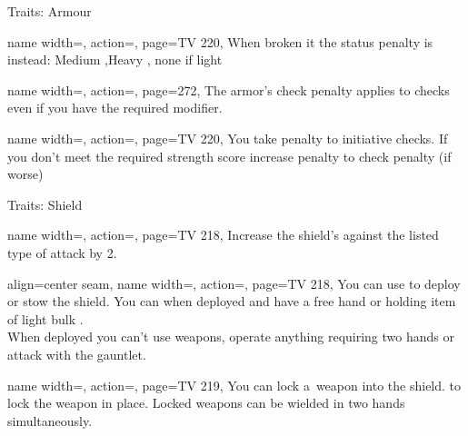 \begin{PageBack}
\begin{Tables}{\backTableHeight}
\begin{Table}{Traits: Armour}
\begin{entry}{}{%
                name width=\conditionLength,%
                action=\Laminar,
                page=TV 220,
            }
                When broken it the status penalty is instead:
                \quad Medium ,\quad Heavy , \quad none if light
            \end{entry}%
            \begin{entry}{}{%
                name width=\conditionLength,%
                action=\Noisy,
                page=272,
            }
                The armor's check penalty applies to \StealthT checks even if you have the required \Strength modifier.
            \end{entry}%
            \begin{entry}{}{%
                name width=\conditionLength,%
                action=\Ponderous,
                page=TV 220,
            }
                You take  penalty to initiative checks.
                If you don't meet the required strength score increase penalty to check penalty {(if worse)}
            \end{entry}%
        \end{Table}
        \TableSpace
        \begin{Table}{Traits: Shield}
            \begin{entry}{}{%
                name width=\conditionLength,%
                action=\Deflecting,
                page=TV 218,
            }
                Increase the shield's \Hardness against the listed type of attack by 2.
            \end{entry}
            \begin{entry}{}{%
                align=center seam,
                name width=\conditionLength,%
                action=\Foldaway,
                page=TV 218,
            }
                You can use  to deploy or stow the shield.
                You can  when deployed and have a free hand or holding item of light bulk . \\
                When deployed you can't use weapons, operate anything requiring two hands or attack with the gauntlet.
            \end{entry}
            \begin{entry}{}{%
                name width=\conditionLength,%
                action=\Harnessed,
                page=TV 219,
            }
                You can lock a \Jousting\,weapon into the shield.  to lock the weapon in place.
                Locked weapons can be wielded in two hands simultaneously.\\

\end{entry}
\end{Table}
\end{Tables}
\end{PageBack}
